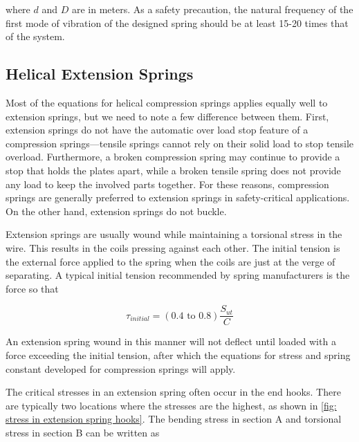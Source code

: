 \documentclass[a4paper,openany,12pt]{book}
\begin{document}
{{where \(d\) and \(D\) are in meters. As a safety precaution, the natural
frequency of the first mode of vibration of the designed spring should
be at least 15-20 times that of the system.

\subsection{Helical Extension Springs}
\label{helical-extension-springs}
Most of the equations for helical compression springs applies equally
well to extension springs, but we need to note a few difference between
them. First, extension springs do not have the automatic over load stop
feature of a compression springs---tensile springs cannot rely on their
solid load to stop tensile overload. Furthermore, a broken compression
spring may continue to provide a stop that holds the plates apart, while
a broken tensile spring does not provide any load to keep the involved
parts together. For these reasons, compression springs are generally
preferred to extension springs in safety-critical applications. On the
other hand, extension springs do not buckle.

Extension springs are usually wound while maintaining a torsional stress
in the wire. This results in the coils pressing against each other. The
initial tension is the external force applied to the spring when the
coils are just at the verge of separating. A typical initial tension
recommended by spring manufacturers is the force so that

$$\tau_{initial} = (0.4 \text{ to } 0.8)\frac{S_{ut}}{C}$$

An extension spring wound in this manner will not deflect until loaded
with a force exceeding the initial tension, after which the equations
for stress and spring constant developed for compression springs will
apply.

The critical stresses in an extension spring often occur in the end
hooks. There are typically two locations where the stresses are the
highest, as shown in
\ref{fig: stress in extension spring hooks}.
The bending stress in section A and torsional stress in section B can be
written as

}}
\end{document}
